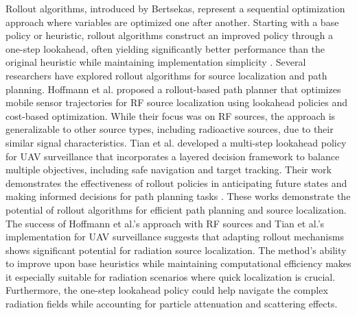 \documentclass[../report.tex]{subfiles}
\begin{document}
    Rollout algorithms, introduced by Bertsekas, represent a sequential optimization approach where variables are optimized one after another. Starting with a base policy or heuristic, rollout
    algorithms construct an improved policy through a one-step lookahead, often yielding significantly better performance than the original heuristic while maintaining implementation 
    simplicity \cite{bertsekas2013rollout}. Several researchers have explored rollout algorithms for source localization and path planning. Hoffmann et al. proposed
    a rollout-based path planner that optimizes mobile sensor trajectories for RF source localization using lookahead policies and cost-based optimization. While their focus was on RF sources, 
    the approach is generalizable to other source types, including radioactive sources, due to their similar signal characteristics\cite{rolloutHoffmann2019}. Tian et al. developed 
    a multi-step lookahead policy for UAV surveillance that incorporates a layered decision framework to balance multiple objectives, including safe navigation and target tracking. Their work 
    demonstrates the effectiveness of rollout policies in anticipating future states and making informed decisions for path planning tasks \cite{rolloutMultiStepLookaheadTian2008}. 
    These works demonstrate the potential of rollout algorithms for efficient path planning and source localization. The success of Hoffmann et al.'s approach with RF sources and Tian et al.'s implementation
    for UAV surveillance suggests that adapting rollout mechanisms shows significant potential for radiation source localization. The method's ability to improve upon base heuristics while
    maintaining computational efficiency makes it especially suitable for radiation scenarios where quick localization is crucial. Furthermore, the one-step lookahead policy could help navigate 
    the complex radiation fields while accounting for particle attenuation and scattering effects.
\end{document}
